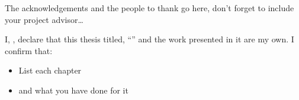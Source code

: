 \documentclass[
11pt, %
oneside, %
english, %
singlespacing, %
]{McMasterThesis} %
\begin{document}
\clearpage

\begin{acknowledgements}
\addchaptertocentry{\acknowledgementname} %

The acknowledgements and the people to thank go here, don't forget to include your project advisor\ldots

\end{acknowledgements}


\tableofcontents %

\listoffigures %

\listoftables %




\begin{declaration}
\addchaptertocentry{\authorshipname}

\noindent I, \authorname, declare that this thesis titled, \enquote{\ttitle} and the work presented in it are my own. I confirm that:

\begin{itemize} 
\item List each chapter
\item and what you have done for it
\end{itemize}
 
 
\end{declaration}
\end{document}
